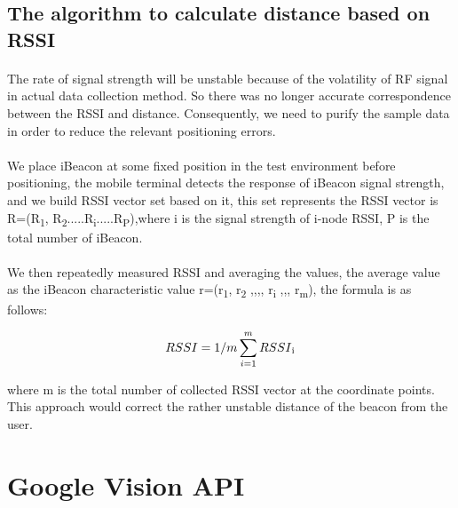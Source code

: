 \documentclass[12pt]{article}
\begin{document}
\subsection{The algorithm to calculate distance based on RSSI}
\paragraph{}The rate of signal strength will be unstable because of the volatility of RF signal in actual data collection method. So there was no longer accurate correspondence between the RSSI and distance. Consequently, we need to purify the sample data in order to reduce the relevant positioning errors.

\paragraph{}We place iBeacon at some fixed position in the test environment before positioning, the mobile terminal detects the response of iBeacon signal strength, and we build RSSI vector set based on it, this set represents the RSSI vector is R=(R\textsubscript{1}, R\textsubscript{2}.....R\textsubscript{i}.....R\textsubscript{P}),where i is the signal strength of i-node RSSI, P is the total number of iBeacon.

\paragraph{}We then repeatedly measured RSSI and averaging the values, the average value as the iBeacon characteristic value r=(r\textsubscript{1}, r\textsubscript{2} ,,,, r\textsubscript{i} ,,, r\textsubscript{m}), the formula is as follows:

\begin{equation}
RSSI = 1/m \sum_{i=1}^m RSSI \textsubscript{i}
\end{equation}

where m is the total number of collected RSSI vector at the coordinate points. This approach would correct the rather unstable distance of the beacon from the user. 

\section{Google Vision API}
\label{vision}
\end{document}
